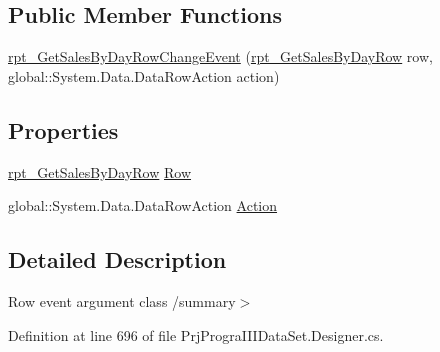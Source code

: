 \subsection*{Public Member Functions}
\begin{DoxyCompactItemize}
\item 
\hyperlink{classprj_progra_i_i_i_1_1_prj_progra_i_i_i_data_set_1_1rpt___get_sales_by_day_row_change_event_a052d891f8dfdd7b64c5b32997e4373b3}{rpt\+\_\+\+Get\+Sales\+By\+Day\+Row\+Change\+Event} (\hyperlink{classprj_progra_i_i_i_1_1_prj_progra_i_i_i_data_set_1_1rpt___get_sales_by_day_row}{rpt\+\_\+\+Get\+Sales\+By\+Day\+Row} row, global\+::\+System.\+Data.\+Data\+Row\+Action action)
\end{DoxyCompactItemize}
\subsection*{Properties}
\begin{DoxyCompactItemize}
\item 
\hyperlink{classprj_progra_i_i_i_1_1_prj_progra_i_i_i_data_set_1_1rpt___get_sales_by_day_row}{rpt\+\_\+\+Get\+Sales\+By\+Day\+Row} \hyperlink{classprj_progra_i_i_i_1_1_prj_progra_i_i_i_data_set_1_1rpt___get_sales_by_day_row_change_event_a55e3f6ed335bcb0f384ef7686770cf3b}{Row}
\item 
global\+::\+System.\+Data.\+Data\+Row\+Action \hyperlink{classprj_progra_i_i_i_1_1_prj_progra_i_i_i_data_set_1_1rpt___get_sales_by_day_row_change_event_a8fa53f3b858dff835fd40d03d7f3ccd5}{Action}
\end{DoxyCompactItemize}


\subsection{Detailed Description}
Row event argument class /summary$>$ 

Definition at line 696 of file Prj\+Progra\+I\+I\+I\+Data\+Set.\+Designer.\+cs.



